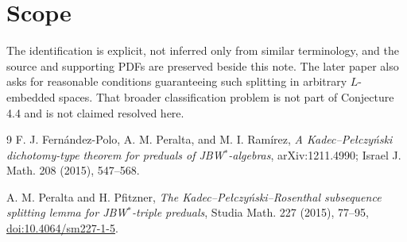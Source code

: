 \documentclass[11pt]{article}
\begin{document}
\section*{Scope}

The identification is explicit, not inferred only from similar terminology, and
the source and supporting PDFs are preserved beside this note. The later paper
also asks for reasonable conditions guaranteeing such splitting in arbitrary
$L$-embedded spaces. That broader classification problem is not part of
Conjecture 4.4 and is not claimed resolved here.

\begin{thebibliography}{9}
F. J. Fern\'andez-Polo, A. M. Peralta, and M. I. Ram\'irez,
\emph{A Kadec--Pe\l czy\'nski dichotomy-type theorem for preduals of
JBW$^*$-algebras}, arXiv:1211.4990; Israel J. Math. 208 (2015), 547--568.

A. M. Peralta and H. Pfitzner,
\emph{The Kadec--Pe\l czy\'nski--Rosenthal subsequence splitting lemma for
JBW$^*$-triple preduals}, Studia Math. 227 (2015), 77--95,
\href{https://doi.org/10.4064/sm227-1-5}{doi:10.4064/sm227-1-5}.
\end{thebibliography}
\end{document}
